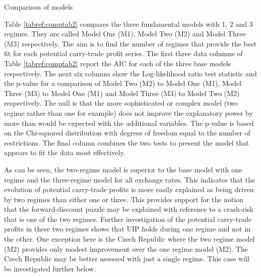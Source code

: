 \documentclass[12pt, a4paper, oneside]{article}\usepackage[]{graphicx}\usepackage[]{color}
\begin{document}
\begin{sidewaystable}[p]
\begin{threeparttable}
\begin{tablenotes}
\end{tablenotes}
\caption{Comparison of models}
\label{tabref:comptab2}
\end{threeparttable}
\end{sidewaystable}

Table \ref{tabref:comptab2} compares the three fundamental models with 1, 2 and 3 regimes. They are called Model One (M1), Model Two (M2) and Model Three (M3) respectively.  The aim is to find the number of regimes that provide the best fit for each potential carry-trade profit series.  The first three data columns of Table \ref{tabref:comptab2} report the AIC for each of the three base models respectively. The next six columns show the Log-likelihood ratio test statistic and the p-value for a comparison of Model Two (M2) to Model One (M1), Model Three (M3) to Model One (M1) and Model Three (M3) to Model Two (M2) respectively. The null is that the more sophisticated or complex model (two regime rather than one for example) does not improve the explanatory power by more than would be expected with the additional variables. The p-value is based on the Chi-squared distribution with degrees of freedom equal to the number of restrictions. The final column combines the two tests to present the model that appears to fit the data most effectively. 

As can be seen, the two-regime model is superior to the base model with one regime and the three-regime model for all exchange rates. This indicates that the evolution of potential carry-trade profits is more easily explained as being driven by two regimes than either one or three.  This provides support for the notion that the forward-discount puzzle may be explained with reference to a crash-risk that is one of the two regimes.  Further investigation of the potential carry-trade profits in these two regimes shows that UIP holds during one regime and not in the other.  One exception here is the Czech Republic where the two regime model (M2) provides only modest improvement over the one regime model (M2).   The Czech Republic may be better assessed with just a single regime. This case will be investigated further below. 
\end{document}
